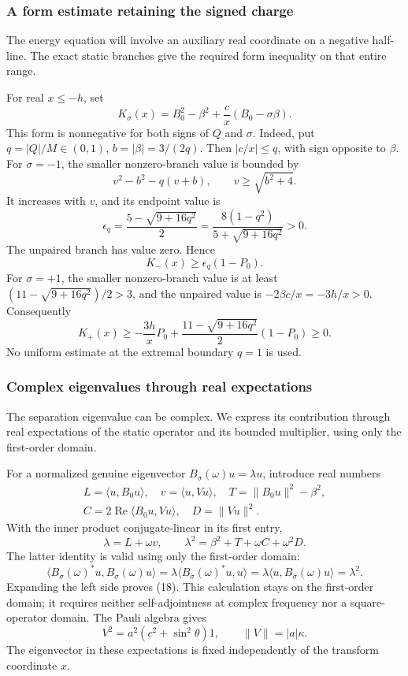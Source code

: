 \documentclass[11pt,a4paper]{article}
\begin{document}
\subsubsection{A form estimate retaining the signed charge}\label{readable-angular-sign}

The energy equation will involve an auxiliary real coordinate on a negative half-line. The exact static branches give the required form inequality on that entire range.

For real \(x\le-h\), set \[
 K_\sigma(x)=B_0^2-\beta^2+\frac c x(B_0-\sigma\beta).
 \tag{15}
\] This form is nonnegative for both signs of \(Q\) and \(\sigma\).
Indeed, put \(q=|Q|/M\in(0,1)\), \(b=|\beta|=3/(2q)\). Then
\(|c/x|\le q\), with sign opposite to \(\beta\). For \(\sigma=-1\), the
smaller nonzero-branch value is bounded by \[
 v^2-b^2-q(v+b),\qquad v\ge\sqrt{b^2+4}.
\] It increases with \(v\), and its endpoint value is \[
 \epsilon_q=\frac{5-\sqrt{9+16q^2}}2
 =\frac{8(1-q^2)}{5+\sqrt{9+16q^2}}>0.
\] The unpaired branch has value zero. Hence \[
 K_-(x)\ge\epsilon_q(1-P_0).
 \tag{16}
\] For \(\sigma=+1\), the smaller nonzero-branch value is at least
\((11-\sqrt{9+16q^2})/2>3\), and the unpaired value is
\(-2\beta c/x=-3h/x>0\). Consequently \[
 K_+(x)\ge-\frac{3h}{x}P_0+
 \frac{11-\sqrt{9+16q^2}}2(1-P_0)\ge0.
 \tag{17}
\] No uniform estimate at the extremal boundary \(q=1\) is used.

\subsubsection{Complex eigenvalues through real expectations}\label{readable-angular-expectations}

The separation eigenvalue can be complex. We express its contribution through real expectations of the static operator and its bounded multiplier, using only the first-order domain.

For a normalized genuine eigenvector \(B_\sigma(\omega)u=\lambda u\),
introduce real numbers \[
\begin{gathered}
 L=\langle u,B_0u\rangle,\quad v=\langle u,Vu\rangle,\quad
 T=\|B_0u\|^2-\beta^2,\\
 C=2\operatorname{Re}\langle B_0u,Vu\rangle,\quad D=\|Vu\|^2.
\end{gathered}
\] With the inner product conjugate-linear in its first entry, \[
 \lambda=L+\omega v,\qquad
 \lambda^2=\beta^2+T+\omega C+\omega^2D .
 \tag{18}
\] The latter identity is valid using only the first-order domain: \[
 \langle B_\sigma(\omega)^*u,B_\sigma(\omega)u\rangle
 =\lambda\langle B_\sigma(\omega)^*u,u\rangle
 =\lambda\langle u,B_\sigma(\omega)u\rangle=\lambda^2.
\] Expanding the left side proves (18). This calculation stays on the first-order domain; it requires neither self-adjointness at complex frequency nor a square-operator domain. The
Pauli algebra gives \[
 V^2=a^2(c^2+\sin^2\theta)1,\qquad \|V\|=|a|\kappa.
 \tag{19}
\] The eigenvector in these expectations is fixed independently of the
transform coordinate \(x\).
\end{document}
